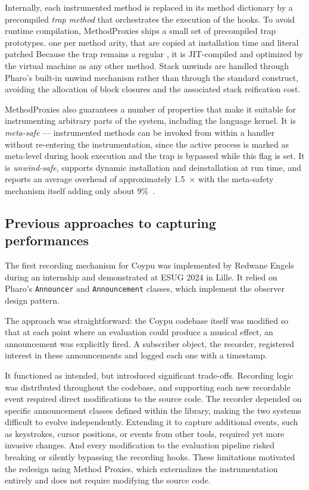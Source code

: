 \documentclass[
]{ceurart}
\begin{document}
Internally, each instrumented method is replaced in its method dictionary by a precompiled \emph{trap method} that orchestrates the execution of the hooks.
To avoid runtime compilation, MethodProxies ships a small set of precompiled trap prototypes. one per method arity, that are copied at installation time and literal patched 
Because the trap remains a regular , it is JIT-compiled and optimized by the virtual machine as any other method.
Stack unwinds are handled through Pharo's built-in unwind mechanism rather than through the standard  construct, avoiding the allocation of block closures and the associated stack reification cost.

MethodProxies also guarantees a number of properties that make it suitable for instrumenting arbitrary parts of the system, including the language kernel. It is \emph{meta-safe} --- instrumented methods can be invoked from within a handler without re-entering the instrumentation, since the active process is marked as meta-level during hook execution and the trap is bypassed while this flag is set.
It is \emph{unwind-safe}, supports dynamic installation and deinstallation at run time, and reports an average overhead of approximately 1.5~$\times$ with the meta-safety mechanism itself adding only about 9\%~\cite{Jord24b}.

\subsection{Previous approaches to capturing performances}
The first recording mechanism for Coypu was implemented by Redwane Engels during an internship and demonstrated at ESUG 2024 in Lille.
It relied on Pharo's \texttt{Announcer} and \texttt{Announcement} classes, which implement the observer design pattern.

The approach was straightforward: the Coypu codebase itself was modified so that at each point where an evaluation could produce a musical effect, an announcement was explicitly fired.
A subscriber object, the recorder, registered interest in these announcements and logged each one with a timestamp.

It functioned as intended, but introduced significant trade-offs.
Recording logic was distributed throughout the codebase, and supporting each new recordable event required direct modifications to the source code.
The recorder depended on specific announcement classes defined within the library, making the two systems difficult to evolve independently.
Extending it to capture additional events, such as keystrokes, cursor positions, or events from other tools, required yet more invasive changes.
And every modification to the evaluation pipeline risked breaking or silently bypassing the recording hooks.
These limitations motivated the redesign using Method Proxies, which externalizes the instrumentation entirely and does not require modifying the source code.
\end{document}
